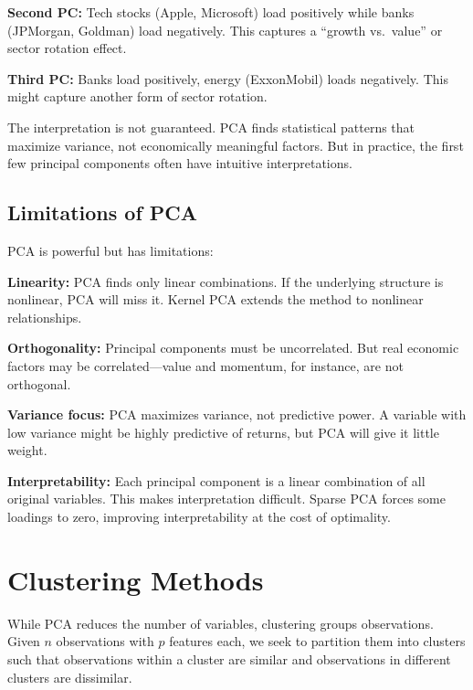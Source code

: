 \documentclass[11pt,a4paper]{article}
\begin{document}
\textbf{Second PC:} Tech stocks (Apple, Microsoft) load positively while banks (JPMorgan, Goldman) load negatively. This captures a ``growth vs.\ value'' or sector rotation effect.

\textbf{Third PC:} Banks load positively, energy (ExxonMobil) loads negatively. This might capture another form of sector rotation.

The interpretation is not guaranteed. PCA finds statistical patterns that maximize variance, not economically meaningful factors. But in practice, the first few principal components often have intuitive interpretations.

\subsection{Limitations of PCA}

PCA is powerful but has limitations:

\textbf{Linearity:} PCA finds only linear combinations. If the underlying structure is nonlinear, PCA will miss it. Kernel PCA extends the method to nonlinear relationships.

\textbf{Orthogonality:} Principal components must be uncorrelated. But real economic factors may be correlated---value and momentum, for instance, are not orthogonal.

\textbf{Variance focus:} PCA maximizes variance, not predictive power. A variable with low variance might be highly predictive of returns, but PCA will give it little weight.

\textbf{Interpretability:} Each principal component is a linear combination of all original variables. This makes interpretation difficult. Sparse PCA forces some loadings to zero, improving interpretability at the cost of optimality.

\section{Clustering Methods}

While PCA reduces the number of variables, clustering groups observations. Given $n$ observations with $p$ features each, we seek to partition them into clusters such that observations within a cluster are similar and observations in different clusters are dissimilar.
\end{document}
